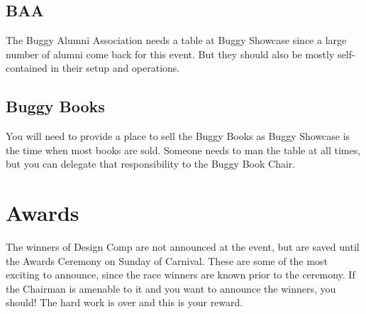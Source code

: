 \subsection{BAA}
The Buggy Alumni Association needs a table at Buggy Showcase since a large
number of alumni come back for this event. But they should also be mostly
self-contained in their setup and operations.

\subsection{Buggy Books}
You will need to provide a place to sell the Buggy Books as Buggy Showcase is
the time when most books are sold. Someone needs to man the table at all times,
but you can delegate that responsibility to the Buggy Book Chair.


\section{Awards}
The winners of Design Comp are not announced at the event, but are saved
until the Awards Ceremony on Sunday of Carnival. These are some of the
most exciting to announce, since the race winners are known prior to the
ceremony. If the Chairman is amenable to it and you want to announce
the winners, you should! The hard work is over and this is your reward.
